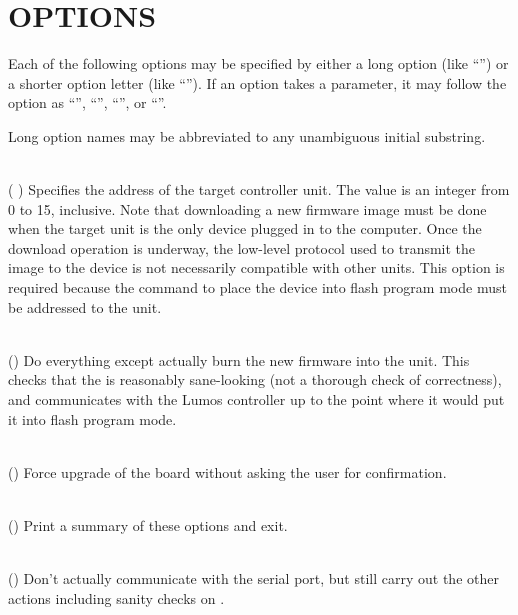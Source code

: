 \section*{OPTIONS}


Each of the following options may be specified by either a long
option (like
``'')
or a shorter option letter (like
``'').
If an option takes a parameter, it may follow the option as
``'',
``'',
``'',
or
``''.


Long option names may be abbreviated to any unambiguous initial substring.
\begin{list}{}{}
\item[{\codetype{----address=}\Var*{addr}}]\hfill\\
(
)
Specifies the address of the target controller unit.  The
value is an integer from 0 to 15, inclusive.  
Note that downloading a new firmware image must be done when the
target unit is the
only
device plugged in to the computer.  Once the download operation is
underway, the low-level protocol used to transmit the image to the
device is not necessarily compatible with other units.  This option
is required because the command to place the device into flash program
mode must be addressed to the unit.
\item[{\codetype{----dry--run}}]\hfill\\
()
Do everything except actually burn the new firmware into the unit.
This checks that the 
is reasonably sane-looking (not a thorough check of correctness),
and communicates with the Lumos controller up to the point where
it would put it into flash program mode.
\item[{\codetype{----force}}]\hfill\\
()
Force upgrade of the board without asking the user for confirmation.
\item[{\codetype{----help}}]\hfill\\
()
Print a summary of these options and exit.
\item[{\codetype{----null--device}}]\hfill\\
()
Don't actually communicate with the serial port, but still carry out the other
actions including sanity checks on 
.

\end{list}
